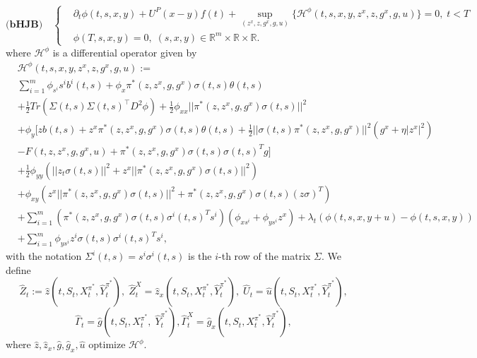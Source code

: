 \documentclass[11pt,a4paper]{article}
\theoremstyle{thmstyleone}%
\theoremstyle{thmstyletwo}%
\theoremstyle{thmstylethree}%
\begin{document}
\[
\textbf{(bHJB)}\quad\begin{cases}
  &  \partial_t \phi(t,s,x,y) + U^P(x - y) f(t) + \sup_{(z^x, z, g^x, g, u)}\bigl \{   \mathcal H^\phi(t,s, x, y,  z^x, z, g^x, g, u) \bigl \}=0,\; t<T\\
&\phi(T,s,x,y)=0,\; (s,x,y)\in \mathbb R^m\times \mathbb R\times \mathbb R.
\end{cases}
\]
 where $\mathcal H^\phi$ is a differential operator given by
\begin{align*}
&\mathcal H^\phi(t,s,x,y,z^x,z,g^x,g,u):=\\
&\sum_{i=1}^m\phi_{s^i} s^ib^i(t,s)  + \phi_x \pi^*(z,z^x,g,g^x) \sigma(t,s) \theta(t,s) \\
&+ \frac12 Tr(\Sigma(t,s)\Sigma(t,s)^\top  D^2\phi)+ \frac{1}{2}\phi_{xx}||\pi^*(z,z^x,g,g^x)  \sigma(t,s)||^2\\
& + \phi_y \Big[z b(t,s) + z^x \pi^*(z,z^x,g,g^x) \sigma(t,s) \theta(t,s)
+ \frac{1}{2}||\sigma(t,s) \pi^*(z,z^x,g,g^x)||^2(g^x + \eta |z^x|^2) \\
&-  F(t, z, z^x, g, g^x,u) + \pi^*(z,z^x,g,g^x) \sigma(t,s) \sigma(t,s)^T g\Big]
   \\
&+ \frac{1}{2}\phi_{yy} (||z_t \sigma(t,s)||^2 + z^x||\pi^*(z,z^x,g,g^x) \sigma(t,s)||^2) \\
&+ \phi_{xy} (z^x ||\pi^*(z,z^x,g,g^x) \sigma(t,s)||^2  + \pi^*(z,z^x,g,g^x) \sigma(t,s) (z \sigma)^T)\\
&+ \sum_{i=1}^m (\pi^*(z,z^x,g,g^x)  \sigma(t,s) \sigma^i(t,s)^T s^i)(\phi_{xs^i} + \phi_{ys^i}z^x) + \lambda_t(\phi(t, s,x, y+u) - \phi(t,s, x, y))\\
&+\sum_{i=1}^m \phi_{ys^i} z^i \sigma(t,s) \sigma^i(t,s)^T s^i,
\end{align*}
with the notation $\Sigma^i(t,s)=s^i \sigma^i(t,s)$ is the $i$-th row of the matrix $\Sigma$.
We define 
\[\hat Z_t:=\hat z(t,S_t,X^{\pi^*}_t,\hat Y^{\pi^*}_t),\; \hat Z_t^X=\hat z_x(t,S_t,X^{\pi^*}_t,\hat Y^{\pi^*}_t),\; \hat U_t=\hat u(t,S_t,X^{\pi^*}_t, \hat Y^{\pi^*}_t),\]
\[\hat \Gamma_t=\hat g(t,S_t,X^{\pi^*}_t,\; \hat Y^{\pi^*}_t), \hat \Gamma_t^X=\hat g_x(t,S_t,X^{\pi^*}_t, \hat Y^{\pi^*}_t),\]
where $\hat z,\hat z_x,\hat g,\hat g_x,\hat u$ optimize $\mathcal H^\phi$.
\end{document}
